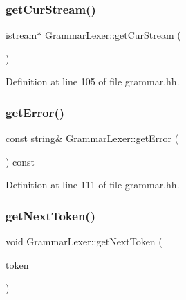 \mbox{\label{class_grammar_lexer_a002169896b7e1d463f3b561cce59de8f}} 
\subsubsection{\texorpdfstring{getCurStream()}{getCurStream()}}
{\footnotesize\ttfamily istream$\ast$ Grammar\+Lexer\+::get\+Cur\+Stream (\begin{DoxyParamCaption}\item[{void}]{ }\end{DoxyParamCaption})\hspace{0.3cm}{\ttfamily [inline]}}



Definition at line 105 of file grammar.\+hh.

\mbox{\label{class_grammar_lexer_adf4a367811f6445ec9b06aeadcd34e55}} 
\subsubsection{\texorpdfstring{getError()}{getError()}}
{\footnotesize\ttfamily const string\& Grammar\+Lexer\+::get\+Error (\begin{DoxyParamCaption}\item[{void}]{ }\end{DoxyParamCaption}) const\hspace{0.3cm}{\ttfamily [inline]}}



Definition at line 111 of file grammar.\+hh.

\mbox{\label{class_grammar_lexer_a789e031dad20e99c2c8a548fac69013d}} 
\subsubsection{\texorpdfstring{getNextToken()}{getNextToken()}}
{\footnotesize\ttfamily void Grammar\+Lexer\+::get\+Next\+Token (\begin{DoxyParamCaption}\item[{\mbox{\hyperlink{class_grammar_token}{Grammar\+Token}} \&}]{token }\end{DoxyParamCaption})}

